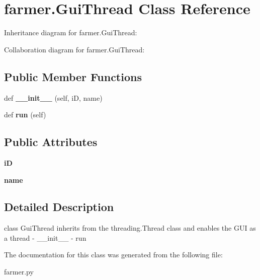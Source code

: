 \hypertarget{classfarmer_1_1GuiThread}{}\section{farmer.\+Gui\+Thread Class Reference}
\label{classfarmer_1_1GuiThread}


Inheritance diagram for farmer.\+Gui\+Thread\+:


Collaboration diagram for farmer.\+Gui\+Thread\+:
\subsection*{Public Member Functions}
\begin{DoxyCompactItemize}
\item 
\mbox{\label{classfarmer_1_1GuiThread_a8227da40c8004bf58bba9b842b642312}} 
def {\bfseries \+\_\+\+\_\+init\+\_\+\+\_\+} (self, iD, name)
\item 
\mbox{\label{classfarmer_1_1GuiThread_a4fdba1cf7d1e535b4b4fbddd0758a8d3}} 
def {\bfseries run} (self)
\end{DoxyCompactItemize}
\subsection*{Public Attributes}
\begin{DoxyCompactItemize}
\item 
\mbox{\label{classfarmer_1_1GuiThread_ab75f4fc345780e2b2e5f045e2782ca08}} 
{\bfseries iD}
\item 
\mbox{\label{classfarmer_1_1GuiThread_aa1eb71a2b8ad270282154b7342fc7edb}} 
{\bfseries name}
\end{DoxyCompactItemize}


\subsection{Detailed Description}
\begin{DoxyVerb}class GuiThread inherits from the threading.Thread class and enables the GUI as a thread
    - __init__
    - run
\end{DoxyVerb}
 

The documentation for this class was generated from the following file\+:\begin{DoxyCompactItemize}
\item 
farmer.\+py\end{DoxyCompactItemize}
